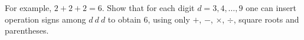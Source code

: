 For example, $2+2+2=6$. Show that for each digit $d=3,4,\dots,9$ one can insert operation signs among $d\ d\ d$ to obtain $6$, using only $+$, $-$, $\times$, $\div$, square roots and parentheses.
